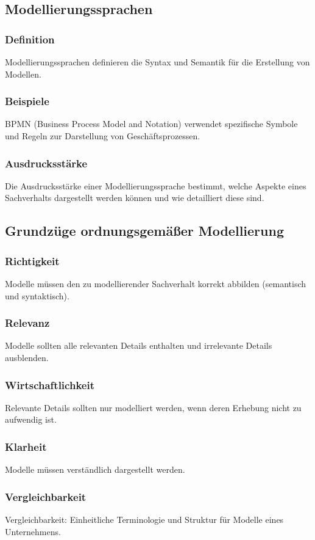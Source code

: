 \subsection{Modellierungssprachen}
    \subsubsection*{Definition}
        Modellierungssprachen definieren die Syntax und Semantik für die Erstellung von Modellen.
    \subsubsection*{Beispiele}
        BPMN (Business Process Model and Notation) verwendet spezifische Symbole und Regeln zur Darstellung von Geschäftsprozessen.
    \subsubsection*{Ausdrucksstärke}
        Die Ausdrucksstärke einer Modellierungssprache bestimmt, welche Aspekte eines Sachverhalts dargestellt werden können und wie detailliert diese sind.

\subsection{Grundzüge ordnungsgemäßer Modellierung}
    \subsubsection*{Richtigkeit}
        Modelle müssen den zu modellierender Sachverhalt korrekt abbilden (semantisch und syntaktisch).
    \subsubsection*{Relevanz}
        Modelle sollten alle relevanten Details enthalten und irrelevante Details ausblenden.
    \subsubsection*{Wirtschaftlichkeit}
        Relevante Details sollten nur modelliert werden, wenn deren Erhebung nicht zu aufwendig ist.
    \subsubsection*{Klarheit}
        Modelle müssen verständlich dargestellt werden.
    \subsubsection*{Vergleichbarkeit}
        Vergleichbarkeit: Einheitliche Terminologie und Struktur für Modelle eines Unternehmens.
